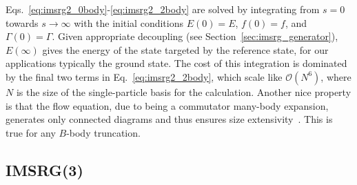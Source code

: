 Eqs.~\eqref{eq:imsrg2_0body}-\eqref{eq:imsrg2_2body} are solved by integrating
from $s=0$ towards $s\rightarrow\infty$ with the initial conditions
$E(0) = E$, $f(0) = f$, and $\Gamma(0)=\Gamma$.
Given appropriate decoupling (see Section~\ref{sec:imsrg_generator}),
$E(\infty)$ gives the energy of the state targeted by the reference state,
for our applications typically the ground state.
The cost of this integration is dominated by the final two terms in Eq.~\eqref{eq:imsrg2_2body},
which scale like $\mathcal{O}(N^6)$,
where $N$ is the size of the single-particle basis for the calculation.
Another nice property is that the flow equation,
due to being a commutator many-body expansion,
generates only connected diagrams and thus ensures size extensivity~\cite{Herg15imsrgphysrep}.
This is true for any $B$-body truncation.

\subsection{IMSRG(3)}\label{sec:imsrgthree}


